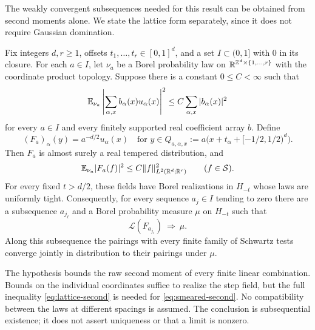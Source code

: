 \documentclass[11pt,letterpaper,reqno]{amsart}
\begin{document}
The weakly convergent subsequences needed for this result can be
obtained from second moments alone. We state the lattice form
separately, since it does not require Gaussian domination.

\begin{theorem}\label{thm:lattice-continuum}
Fix integers $d,r\ge1$, offsets $t_1,\ldots,t_r\in[0,1]^d$,
and a set $I\subset(0,1]$ with $0$ in its closure. For each
$a\in I$, let $\nu_a$ be a Borel probability law on
$\mathbb R^{\mathbb Z^d\times\{1,\ldots,r\}}$ with the coordinate product
topology. Suppose there is a constant $0\le C<\infty$ such that
\begin{equation}\label{eq:lattice-second}
 \mathbb E_{\nu_a}\left|\sum_{\alpha,x}b_\alpha(x)u_\alpha(x)\right|^2
 \le C\sum_{\alpha,x}|b_\alpha(x)|^2
\end{equation}
for every $a\in I$ and every finitely supported real coefficient
array $b$. Define
\begin{equation}\label{eq:step-definition}
 (F_a)_\alpha(y)=a^{-d/2}u_\alpha(x)
 \quad\text{for }y\in Q_{a,\alpha,x}
 :=a\bigl(x+t_\alpha+[-1/2,1/2)^d\bigr).
\end{equation}
Then $F_a$ is almost surely a real tempered distribution, and
\begin{equation}\label{eq:smeared-second}
 \mathbb E_{\nu_a}|F_a(f)|^2\le C\|f\|_{L^2(\mathbb R^d;\mathbb R^r)}^2
 \qquad(f\in\mathcal S).
\end{equation}
For every fixed $t>d/2$, these fields have Borel realizations in
$H_{-t}$ whose laws are uniformly tight. Consequently, for every
sequence $a_j\in I$ tending to zero there are a subsequence
$a_{j_\ell}$ and a Borel probability measure $\mu$ on $H_{-t}$
such that
\[
 \mathcal L(F_{a_{j_\ell}})\ \Longrightarrow\ \mu.
\]
Along this subsequence the pairings with every finite family of
Schwartz tests converge jointly in distribution to their pairings
under $\mu$.
\end{theorem}

The hypothesis bounds the raw second moment of every finite linear
combination. Bounds on the individual coordinates suffice to realize
the step field, but the full inequality \eqref{eq:lattice-second}
is needed for \eqref{eq:smeared-second}. No compatibility between
the laws at different spacings is assumed. The conclusion is
subsequential existence; it does not assert uniqueness or that a
limit is nonzero.
\end{document}
